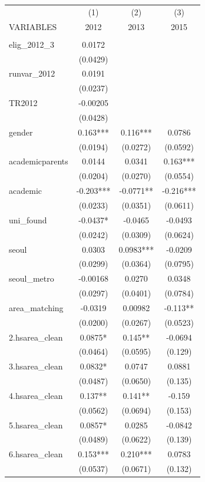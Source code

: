 \documentclass[]{article}
\begin{document}
\begin{tabular}{lccc} \hline
 & (1) & (2) & (3) \\
VARIABLES & 2012 & 2013 & 2015 \\ \hline
 &  &  &  \\
elig\_2012\_3 & 0.0172 &  &  \\
 & (0.0429) &  &  \\
runvar\_2012 & 0.0191 &  &  \\
 & (0.0237) &  &  \\
TR2012 & -0.00205 &  &  \\
 & (0.0428) &  &  \\
gender & 0.163*** & 0.116*** & 0.0786 \\
 & (0.0194) & (0.0272) & (0.0592) \\
academicparents & 0.0144 & 0.0341 & 0.163*** \\
 & (0.0204) & (0.0270) & (0.0554) \\
academic & -0.203*** & -0.0771** & -0.216*** \\
 & (0.0233) & (0.0351) & (0.0611) \\
uni\_found & -0.0437* & -0.0465 & -0.0493 \\
 & (0.0242) & (0.0309) & (0.0624) \\
seoul & 0.0303 & 0.0983*** & -0.0209 \\
 & (0.0299) & (0.0364) & (0.0795) \\
seoul\_metro & -0.00168 & 0.0270 & 0.0348 \\
 & (0.0297) & (0.0401) & (0.0784) \\
area\_matching & -0.0319 & 0.00982 & -0.113** \\
 & (0.0200) & (0.0267) & (0.0523) \\
2.hsarea\_clean & 0.0875* & 0.145** & -0.0694 \\
 & (0.0464) & (0.0595) & (0.129) \\
3.hsarea\_clean & 0.0832* & 0.0747 & 0.0881 \\
 & (0.0487) & (0.0650) & (0.135) \\
4.hsarea\_clean & 0.137** & 0.141** & -0.159 \\
 & (0.0562) & (0.0694) & (0.153) \\
5.hsarea\_clean & 0.0857* & 0.0285 & -0.0842 \\
 & (0.0489) & (0.0622) & (0.139) \\
6.hsarea\_clean & 0.153*** & 0.210*** & 0.0783 \\
 & (0.0537) & (0.0671) & (0.132) \\

\end{tabular}
\end{document}
